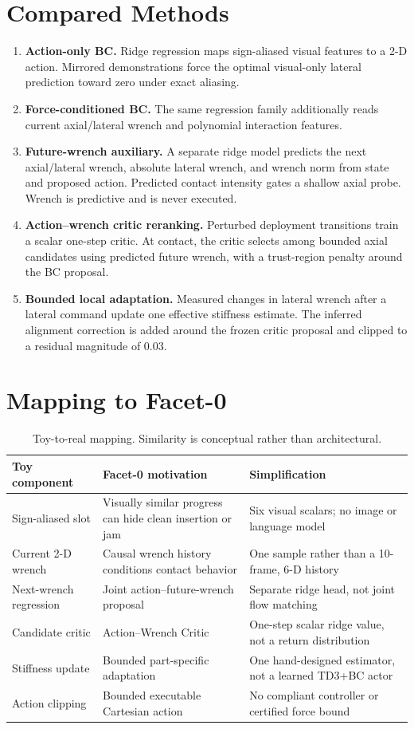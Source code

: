 \documentclass[11pt]{article}
\begin{document}
\section{Compared Methods}
\begin{enumerate}[leftmargin=1.7em]
  \item \textbf{Action-only BC.} Ridge regression maps sign-aliased visual features to a 2-D action. Mirrored demonstrations force the optimal visual-only lateral prediction toward zero under exact aliasing.
  \item \textbf{Force-conditioned BC.} The same regression family additionally reads current axial/lateral wrench and polynomial interaction features.
  \item \textbf{Future-wrench auxiliary.} A separate ridge model predicts the next axial/lateral wrench, absolute lateral wrench, and wrench norm from state and proposed action. Predicted contact intensity gates a shallow axial probe. Wrench is predictive and is never executed.
  \item \textbf{Action--wrench critic reranking.} Perturbed deployment transitions train a scalar one-step critic. At contact, the critic selects among bounded axial candidates using predicted future wrench, with a trust-region penalty around the BC proposal.
  \item \textbf{Bounded local adaptation.} Measured changes in lateral wrench after a lateral command update one effective stiffness estimate. The inferred alignment correction is added around the frozen critic proposal and clipped to a residual magnitude of 0.03.
\end{enumerate}

\section{Mapping to Facet-0}
\begin{table}[H]
\centering
\small
\begin{tabular}{p{}p{}p{}}
\toprule
Toy component & Facet-0 motivation & Simplification \\
\midrule
Sign-aliased slot & Visually similar progress can hide clean insertion or jam & Six visual scalars; no image or language model \\
Current 2-D wrench & Causal wrench history conditions contact behavior & One sample rather than a 10-frame, 6-D history \\
Next-wrench regression & Joint action--future-wrench proposal & Separate ridge head, not joint flow matching \\
Candidate critic & Action--Wrench Critic & One-step scalar ridge value, not a return distribution \\
Stiffness update & Bounded part-specific adaptation & One hand-designed estimator, not a learned TD3+BC actor \\
Action clipping & Bounded executable Cartesian action & No compliant controller or certified force bound \\
\bottomrule
\end{tabular}
\caption{Toy-to-real mapping. Similarity is conceptual rather than architectural.}
\end{table}
\end{document}
